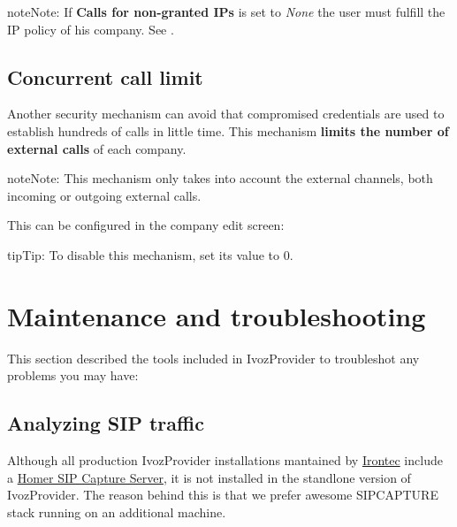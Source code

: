 \documentclass[letterpaper,10pt,english]{sphinxmanual}
\begin{document}
\begin{notice}{note}{Note:}
If \textbf{Calls for non-granted IPs} is set to \emph{None} the user must fulfill
the IP policy of his company. See {\hyperref[platform/antiflood:antiflood\string-trusted\string-ips]{}}.
\end{notice}


\section{Concurrent call limit}
\label{security/index:concurrent-call-limit}
Another security mechanism can avoid that compromised credentials are used to
establish hundreds of calls in little time. This mechanism \textbf{limits the number
of external calls} of each company.

\begin{notice}{note}{Note:}
This mechanism only takes into account the external channels, both
incoming or outgoing external calls.
\end{notice}

This can be configured in the company edit screen:


\begin{notice}{tip}{Tip:}
To disable this mechanism, set its value to 0.
\end{notice}


\chapter{Maintenance and troubleshooting}
\label{maintenance/index::doc}\label{maintenance/index:maintenance-and-troubleshooting}
This section described the tools included in IvozProvider to troubleshot any
problems you may have:


\section{Analyzing SIP traffic}
\label{maintenance/sip_captures:analyzing-sip-traffic}\label{maintenance/sip_captures::doc}
Although all production IvozProvider installations mantained by
\href{https://www.irontec.com}{Irontec} include a \href{https://www.sipcapture.org/}{Homer SIP Capture Server}, it is not installed in the standlone version
of IvozProvider. The reason behind this is that we prefer awesome SIPCAPTURE
stack running on an additional machine.
\end{document}
